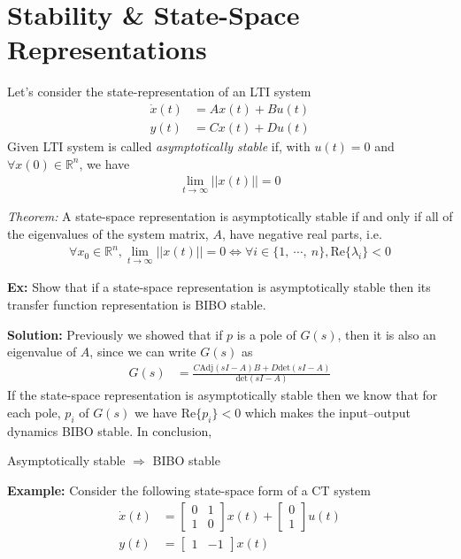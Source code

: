 \documentclass[twoside]{article}
\begin{document}
\newpage

\section{Stability \& State-Space Representations}

Let's consider the state-representation of an LTI system 
%
\begin{align*}
  \dot{x}(t) &= A x(t) + B u(t)
\\
  y(t) &= C x(t) + D u(t)
\end{align*}
%
Given LTI system is called \textit{asymptotically stable} if,
with $u(t) = 0$ and $\forall x(0) \in \mathbb{R}^n$, we have
%
\begin{align*}
  \lim_{t \to \infty} || x(t) || = 0
\end{align*}

\textit{Theorem:} A state-space representation is 
asymptotically stable if and only if all of the eigenvalues
of the system matrix, $A$, have negative real parts, i.e.
%
\begin{align*}
    \forall x_0 \in \mathbb{R}^n, \lim_{t \to \infty} || x(t) || = 0
    \iff \forall i \in \lbrace 1 , \ \cdots ,  \ n \rbrace, \mathrm{Re} \lbrace \lambda_i  \rbrace < 0
\end{align*}
%

\vspace{6pt}

\textbf{Ex:} Show that if a state-space representation is asymptotically stable
then its transfer function representation is BIBO stable.

\vspace{6pt}

\textbf{Solution:} Previously we showed that 
if  $p$ is a pole of $G(s)$, then it is also an
eigenvalue of $A$, since we can write $G(s)$ as 
%
\begin{align*}
 G(s) &= \frac{C \mathrm{Adj} \left(s I - A \right) B + D \mathrm{det}
        \left(s I - A
                               \right)}{\mathrm{det} \left(s I - A
                               \right) }
\end{align*}
%
If the state-space representation is asymptotically stable then
we know that for each pole, $p_i$ of $G(s)$ we have $\mathrm{Re} \lbrace p_i  \rbrace < 0$
which makes the input--output dynamics BIBO stable. In conclusion,

Asymptotically stable $\Rightarrow$ BIBO stable
%

\textbf{Example:} Consider the following state-space form of a
CT system 
%
\begin{align*}
\dot{x}(t) &= 
\left[ \begin{array}{cc} 0 & 1 \\ 1 & 0 \end{array} \right]
x(t)
+
\left[ \begin{array}{c} 0 \\ 1 \end{array} \right] u(t)
\\
y(t) &= \left[ \begin{array}{cc} 1 & -1 \end{array} \right] x(t)
\end{align*}
\end{document}
